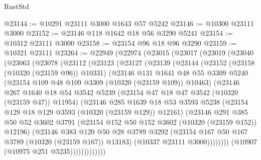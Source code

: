 \begin{lexlean}{RustStd}
\begin{coremodule}
@23144 := @10291 @23111 @3000 @1643 @57 @5242
@23146 := @10300 @23111 @3000
@23152 := @23146 @118 @1642 @18 @56 @3290 @5241
@23154 := @10312 @23111 @3000
@23158 := @23154 @96 @18 @96 @3290
@23159 := @10321 @23111
@23264 := @22949
    (@22974
      (@23015
        (@23017
          (@23019
            (@23040
              (@23063
                (@23078
                  (@23112
                    (@23123
                      (@23127
                        (@23139
                          (@23144
                            (@23152
                              (@23158 (@10320 (@23159 @96)) @10331)
                              (@23146
                                @131
                                @1641
                                @48
                                @55
                                @3309
                                @5240
                                (@23154 @109 @48 @109 @3309 (@10320 (@23159 @109)) @10463)
                                (@23146
                                  @267
                                  @1640
                                  @18
                                  @54
                                  @3542
                                  @5239
                                  (@23154 @47 @18 @47 @3542 (@10320 (@23159 @47)) @11954)
                                  (@23146
                                    @285
                                    @1639
                                    @18
                                    @53
                                    @3593
                                    @5238
                                    (@23154 @129 @18 @129 @3593 (@10320 (@23159 @129)) @12161)
                                    (@23146
                                      @291
                                      @385
                                      @50
                                      @52
                                      @3602
                                      @3791
                                      (@23154 @152 @50 @152 @3602 (@10320 (@23159 @152)) @12196)
                                      (@23146
                                        @383
                                        @120
                                        @50
                                        @28
                                        @3789
                                        @3292
                                        (@23154 @167 @50 @167 @3789 (@10320 (@23159 @167)) @13183)
                                        (@10337 @23111 @3000))))))))
                          (@10907 (@10975 @251 @5235)))))))))))))

\end{coremodule}
\end{lexlean}
